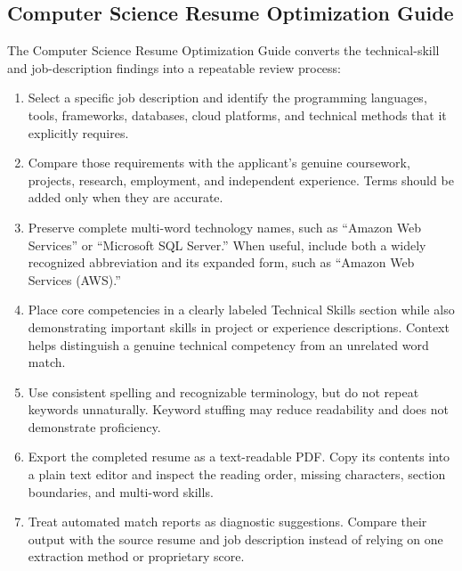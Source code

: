 \documentclass[conference]{IEEEtran}
\begin{document}
\subsection{Computer Science Resume Optimization Guide}

The Computer Science Resume Optimization Guide converts the
technical-skill and job-description findings into a repeatable review
process:

\begin{enumerate}
    \item Select a specific job description and identify the programming
    languages, tools, frameworks, databases, cloud platforms, and
    technical methods that it explicitly requires.

    \item Compare those requirements with the applicant's genuine
    coursework, projects, research, employment, and independent
    experience. Terms should be added only when they are accurate.

    \item Preserve complete multi-word technology names, such as
    ``Amazon Web Services'' or ``Microsoft SQL Server.'' When useful,
    include both a widely recognized abbreviation and its expanded form,
    such as ``Amazon Web Services (AWS).''

    \item Place core competencies in a clearly labeled Technical Skills
    section while also demonstrating important skills in project or
    experience descriptions. Context helps distinguish a genuine
    technical competency from an unrelated word match.

    \item Use consistent spelling and recognizable terminology, but do
    not repeat keywords unnaturally. Keyword stuffing may reduce
    readability and does not demonstrate proficiency.

    \item Export the completed resume as a text-readable PDF. Copy its
    contents into a plain text editor and inspect the reading order,
    missing characters, section boundaries, and multi-word skills.

    \item Treat automated match reports as diagnostic suggestions.
    Compare their output with the source resume and job description
    instead of relying on one extraction method or proprietary score.
\end{enumerate}
\end{document}
